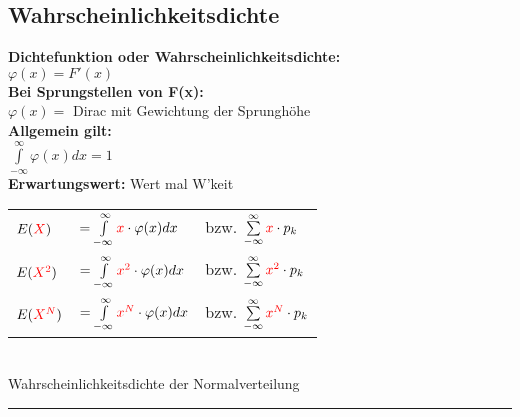 \subsection{Wahrscheinlichkeitsdichte}
\begin{multicols}{2}
\textbf{Dichtefunktion oder Wahrscheinlichkeitsdichte:} \\
$\varphi(x) = F'(x)$ \\
\textbf{Bei Sprungstellen von F(x):} \\
$\varphi(x) = $ Dirac mit Gewichtung der Sprunghöhe\\
\textbf{Allgemein gilt:}\\
$\int\limits_{-\infty}^{\infty}\varphi (x) dx = 1$\\[1pt]

\textbf{Erwartungswert:} Wert mal W'keit\\
\begin{tabular}{l l l}
	$E(\textcolor{red}{X})$ &  
$ = \int\limits_{-\infty}^{\infty} \textcolor{red}{x} \cdot \varphi(x) dx$  & 
bzw. $\sum\limits_{-\infty}^{\infty} \textcolor{red}{x} \cdot p_k$\\

	$E(\textcolor{red}{X^2})$ & 
$ = \int\limits_{-\infty}^{\infty} \textcolor{red}{x^2} \cdot \varphi(x) dx$ & 
bzw. $\sum\limits_{-\infty}^{\infty} \textcolor{red}{x^2} \cdot p_k$\\

	$E(\textcolor{red}{X^N})$ & 
$ = \int\limits_{-\infty}^{\infty} \textcolor{red}{x^N} \cdot \varphi(x) dx$ 
& bzw. $\sum\limits_{-\infty}^{\infty} \textcolor{red}{x^N} \cdot p_k$
\end{tabular}

\columnbreak
\\
Wahrscheinlichkeitsdichte der Normalverteilung
\end{multicols}

\hrule


